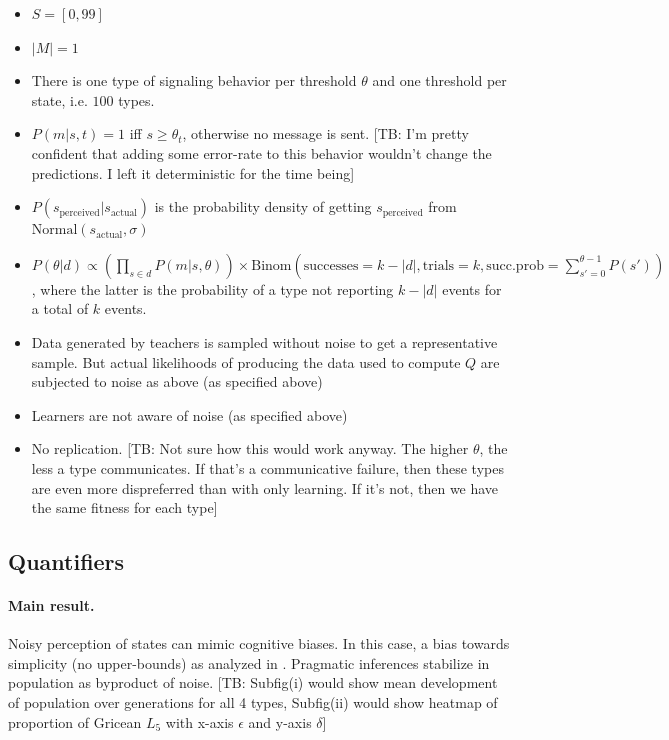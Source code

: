 \documentclass[11pt]{article}
\newcommand{\tb}[1]{\textcolor[rgb]{.8,.33,.0}{[TB: #1]}}%
\begin{document}
\begin{itemize}
  \item $S = [0,99]$
  \item $|M| = 1$
  \item There is one type of signaling behavior per threshold $\theta$ and one threshold per state, i.e. $100$ types.
  \item $P(m|s,t) = 1$ iff $s \geq \theta_t$, otherwise no message is sent. \tb{I'm pretty confident that adding some error-rate to this behavior wouldn't change the predictions. I left it deterministic for the time being}
  \item $P(s_{\text{perceived}} | s_{\text{actual}})$ is the probability density of getting $s_{\text{perceived}}$ from $\text{Normal}(s_{\text{actual}},\sigma)$
  \item $P(\theta | d) \propto (\prod_{s \in d} P(m|s,\theta)) \times \text{Binom}(\text{successes} = k-|d|, \text{trials} = k, \text{succ.prob} = \sum_{s'=0}^{\theta-1} P(s'))$, where the latter is the probability of a type not reporting $k-|d|$ events for a total of $k$ events.
  \item Data generated by teachers is sampled without noise to get a representative sample. But actual likelihoods of producing the data used to compute $Q$ are subjected to noise as above (as specified above)
  \item Learners are not aware of noise (as specified above)
  \item No replication. \tb{Not sure how this would work anyway. The higher $\theta$, the less a type communicates. If that's a communicative failure, then these types are even more dispreferred than with only learning. If it's not, then we have the same fitness for each type}
\end{itemize}

\subsection{Quantifiers}
\paragraph{Main result.} Noisy perception of states can mimic cognitive biases. In this case, a bias towards simplicity (no upper-bounds) as analyzed in \citet{brochhagen+etal:2016:CogSci}. Pragmatic inferences stabilize in population as byproduct of noise. \tb{Subfig(i) would show mean development of population over generations for all 4 types, Subfig(ii) would show heatmap of proportion of Gricean $L_5$ with x-axis $\epsilon$ and y-axis $\delta$}
\end{document}
